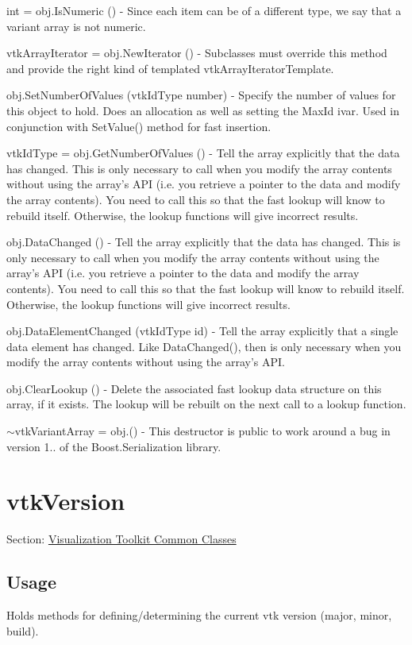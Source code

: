 \begin{DoxyItemize}
\item {\ttfamily int = obj.\-Is\-Numeric ()} -\/ Since each item can be of a different type, we say that a variant array is not numeric.  
\item {\ttfamily vtk\-Array\-Iterator = obj.\-New\-Iterator ()} -\/ Subclasses must override this method and provide the right kind of templated vtk\-Array\-Iterator\-Template.  
\item {\ttfamily obj.\-Set\-Number\-Of\-Values (vtk\-Id\-Type number)} -\/ Specify the number of values for this object to hold. Does an allocation as well as setting the Max\-Id ivar. Used in conjunction with Set\-Value() method for fast insertion.  
\item {\ttfamily vtk\-Id\-Type = obj.\-Get\-Number\-Of\-Values ()} -\/ Tell the array explicitly that the data has changed. This is only necessary to call when you modify the array contents without using the array's A\-P\-I (i.\-e. you retrieve a pointer to the data and modify the array contents). You need to call this so that the fast lookup will know to rebuild itself. Otherwise, the lookup functions will give incorrect results.  
\item {\ttfamily obj.\-Data\-Changed ()} -\/ Tell the array explicitly that the data has changed. This is only necessary to call when you modify the array contents without using the array's A\-P\-I (i.\-e. you retrieve a pointer to the data and modify the array contents). You need to call this so that the fast lookup will know to rebuild itself. Otherwise, the lookup functions will give incorrect results.  
\item {\ttfamily obj.\-Data\-Element\-Changed (vtk\-Id\-Type id)} -\/ Tell the array explicitly that a single data element has changed. Like Data\-Changed(), then is only necessary when you modify the array contents without using the array's A\-P\-I.  
\item {\ttfamily obj.\-Clear\-Lookup ()} -\/ Delete the associated fast lookup data structure on this array, if it exists. The lookup will be rebuilt on the next call to a lookup function.  
\item {\ttfamily $\sim$vtk\-Variant\-Array = obj.()} -\/ This destructor is public to work around a bug in version 1.. of the Boost.\-Serialization library.  
\end{DoxyItemize}\hypertarget{vtkcommon_vtkversion}{}\section{vtk\-Version}\label{vtkcommon_vtkversion}
Section\-: \hyperlink{sec_vtkcommon}{Visualization Toolkit Common Classes} \hypertarget{vtkwidgets_vtkxyplotwidget_Usage}{}\subsection{Usage}\label{vtkwidgets_vtkxyplotwidget_Usage}
Holds methods for defining/determining the current vtk version (major, minor, build).

